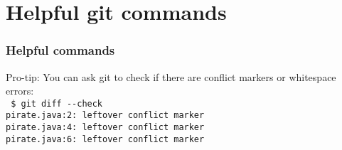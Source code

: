 \documentclass[t]{beamer}
\begin{document}

\section{Helpful git commands}
\begin{frame}
  \frametitle{Helpful commands}

  Pro-tip: You can ask git to check if there are conflict markers or
  whitespace errors:\\[0.25\baselineskip]
    {\scriptsize\texttt{%
    \$ git diff -{}-check\\
    pirate.java:2: leftover conflict marker\\
    pirate.java:4: leftover conflict marker\\
    pirate.java:6: leftover conflict marker\\
    }}

\end{frame}

\end{document}

